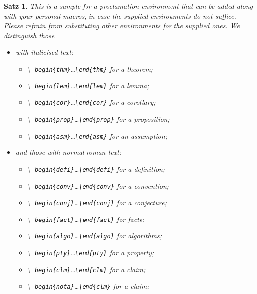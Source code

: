 \documentclass{jpc} %
\theoremstyle{plain}\newtheorem{satz}[thm]{Satz} %
\begin{document}
\begin{satz}\label{T:big}
  This is a sample for a proclamation environment that can be added
  along with your personal macros, \emph{in case the supplied
    environments do not suffice}.  Please refrain from substituting
  other environments for the supplied ones.  We distinguish those 
\begin{itemize}
\item with italicised text:
\begin{itemize}
\item\emph{\texttt{\textbackslash
    begin\{thm\}}\dots\texttt{\textbackslash end\{thm\}}} for a theorem;
\item\emph{\texttt{\textbackslash
    begin\{lem\}}\dots\texttt{\textbackslash end\{lem\}}} for a lemma;
\item\emph{\texttt{\textbackslash
    begin\{cor\}}\dots\texttt{\textbackslash end\{cor\}}} for a corollary;
\item\emph{\texttt{\textbackslash
    begin\{prop\}}\dots\texttt{\textbackslash end\{prop\}}} for a proposition;
\item\emph{\texttt{\textbackslash
    begin\{asm\}}\dots\texttt{\textbackslash end\{asm\}}} for an
  assumption;
\end{itemize}
\item  and those with normal roman text:
\begin{itemize}
\item\emph{\texttt{\textbackslash
    begin\{defi\}}\dots\texttt{\textbackslash end\{defi\}}} for a definition;
\item\emph{\texttt{\textbackslash
    begin\{conv\}}\dots\texttt{\textbackslash end\{conv\}}} for a convention;
\item\emph{\texttt{\textbackslash
    begin\{conj\}}\dots\texttt{\textbackslash end\{conj\}}} for a conjecture;
\item\emph{\texttt{\textbackslash
    begin\{fact\}}\dots\texttt{\textbackslash end\{fact\}}} for facts;
\item\emph{\texttt{\textbackslash
    begin\{algo\}}\dots\texttt{\textbackslash end\{algo\}}} for algorithms;
\item\emph{\texttt{\textbackslash
    begin\{pty\}}\dots\texttt{\textbackslash end\{pty\}}} for a property;
\item\emph{\texttt{\textbackslash
    begin\{clm\}}\dots\texttt{\textbackslash end\{clm\}}} for a claim;
\item\emph{\texttt{\textbackslash
    begin\{nota\}}\dots\texttt{\textbackslash end\{clm\}}} for a claim;

\end{itemize}
\end{itemize}
\end{satz}
\end{document}
